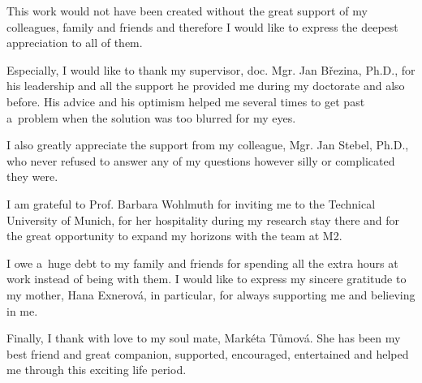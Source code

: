 \documentclass[bibliography=totocnumbered,dvipsnames,FM,Dis,EN]{tulthesis}
\begin{document}
\begin{acknowledgement}
\thispagestyle{empty}
This work would not have been created without the great support of my colleagues, family and friends
and therefore I would like to express the deepest appreciation to all of them.

Especially, I would like to thank my supervisor, doc. Mgr. Jan B{\v r}ezina, Ph.D., for his leadership and all the support he provided me
during my doctorate and also before. His advice and his optimism helped me several times to get past a~problem
when the solution was too blurred for my eyes.

I also greatly appreciate the support from my colleague, Mgr. Jan Stebel, Ph.D.,
who never refused to answer any of my questions however silly or complicated they were.

I am grateful to Prof. Barbara Wohlmuth for inviting me to the Technical University of Munich,
for her hospitality during my research stay there and for the great opportunity to expand my horizons with the team at M2.

I owe a~huge debt to my family and friends for spending all the extra hours at work instead of being with them.
I would like to express my sincere gratitude to my mother, Hana Exnerov\'a, in particular, for always supporting me and believing in me.

Finally, I thank with love to my soul mate, Markéta Tůmová. She has been my best friend and great companion,
supported, encouraged, entertained and helped me through this exciting life period.


% 
% 
% 


\end{acknowledgement}
\end{document}
